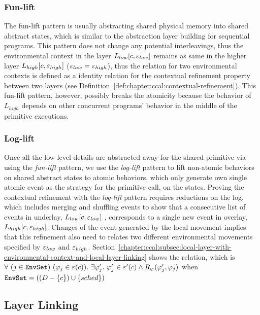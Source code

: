\subsubsection{Fun-lift}
The fun-lift pattern is usually abstracting shared physical memory into shared abstract states,
which is similar to the abstraction layer building for sequential programs.
This pattern does not change any potential interleavings, 
thus the environmental context in the layer $L_{low}[c, {\varepsilon}_{low}]$ remains 
as same in the higher layer $L_{high}[c, {\varepsilon}_{high}]$ (${\varepsilon}_{low} = {\varepsilon}_{high}$), thus the 
relation for two environmental contexts is defined as a identity relation 
for the contextual refinement property between two layers (see Definition~\ref{def:chapter:ccal:contextual-refinement}).
This fun-lift pattern, however, possibly breaks the atomicity because the behavior of $L_{high}$ depends on other concurrent programs’ behavior in the middle of the primitive executions. 

\subsubsection{Log-lift}

Once all the low-level details are abstracted away for the shared primitive via using the \textit{fun-lift} pattern, we use the \textit{log-lift} pattern to lift non-atomic behaviors on shared abstract states to atomic behaviors, which only generate own single atomic event as the strategy for the primitive call, on the states. 
Proving the contextual refinement with the \textit{log-lift} pattern requires reductions on the log, 
which includes merging and shuffling events to show 
that a consecutive list of  events in underlay, $L_{low}[c, {\varepsilon}_{low}]$ , corresponds to a single new event in overlay, 
$L_{high}[c, {\varepsilon}_{high}]$.  Changes of the event generated by the local movement 
implies that this refinement also need to relates two different environmental movements specified by ${\varepsilon}_{low}$ and ${\varepsilon}_{high}$.
Section~\ref{chapter:ccal:subsec:local-layer-with-environmental-context-and-local-layer-linking} shows the relation,
which is $\forall\ (j \in \codeinmath{EnvSet})\ 
(\strat{j} \in \oracle(c)) .\ \exists \stratp{j} . \ \stratp{j} \in \oracle'(c) \wedge R_{\strat{}}(\stratp{j}, \strat{j})$ when 
${\mathrm{\texttt{EnvSet}}} = ((D - \{ c\}) \cup \{ sched\})$

\subsection{Layer Linking}
\label{chapter:ccal:subsec:linking}


